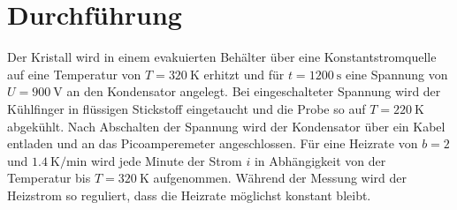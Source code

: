 \section{Durchführung}
\label{sec:Durchführung}

Der Kristall wird in einem evakuierten Behälter über eine Konstantstromquelle auf eine Temperatur von $T=\SI{320}{\kelvin}$ erhitzt und für $t=\SI{1200}{\second}$ eine Spannung von $U=\SI{900}{\volt}$ an den Kondensator angelegt.
Bei eingeschalteter Spannung wird der Kühlfinger in flüssigen Stickstoff eingetaucht und die Probe so auf $T=\SI{220}{\kelvin}$ abgekühlt.
Nach Abschalten der Spannung wird der Kondensator über ein Kabel entladen und an das Picoamperemeter angeschlossen.
Für eine Heizrate von $b=2$ und $\SI{1,4}{\kelvin\per\minute}$ wird jede Minute der Strom $i$ in Abhängigkeit von der Temperatur bis $T=\SI{320}{\kelvin}$ aufgenommen.
Während der Messung wird der Heizstrom so reguliert, dass die Heizrate möglichst konstant bleibt.
